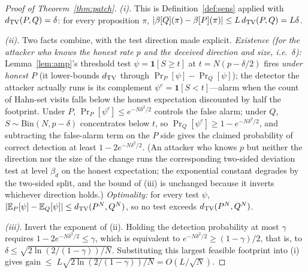 \begin{proof}[Proof of Theorem~\ref{thm:patch}]
\emph{(i).} This is Definition~\ref{def:sens} applied with
$d_{\mathrm{TV}}(P,Q)=\delta$: for every proposition $\pi$,
$|\beta[Q](\pi)-\beta[P](\pi)|\le L\,d_{\mathrm{TV}}(P,Q)=L\delta$.

\emph{(ii).} Two facts combine, with the test direction made explicit.
\emph{Existence (for the attacker who knows the honest rate $p$ and the
deceived direction and size, i.e.\ $\delta$):} Lemma~\ref{lem:amp}'s
threshold test $\psi=\mathbf{1}[S\ge t]$ at $t=N(p-\delta/2)$ fires
\emph{under honest $P$} (it lower-bounds $d_{\mathrm{TV}}$ through
$\Pr_P[\psi]-\Pr_Q[\psi]$); the detector the attacker actually runs is its
complement $\psi^{c}=\mathbf{1}[S<t]$---alarm when the count of Hahn-set
visits falls below the honest expectation discounted by half the
footprint. Under $P$, $\Pr_P[\psi^{c}]\le e^{-N\delta^{2}/2}$ controls the
false alarm; under $Q$, $S\sim\mathrm{Bin}(N,p-\delta)$ concentrates below
$t$, so $\Pr_Q[\psi^{c}]\ge1-e^{-N\delta^{2}/2}$, and subtracting the
false-alarm term on the $P$ side gives the claimed probability of correct
detection at least $1-2e^{-N\delta^{2}/2}$. (An attacker who
knows $p$ but neither the direction nor the size of the change runs the
corresponding two-sided deviation test at level $\beta_d$ on the honest
expectation; the exponential constant degrades by the two-sided split, and
the bound of (iii) is unchanged because it inverts whichever direction
holds.) \emph{Optimality:} for every
test $\psi$, $|\mathbb{E}_P[\psi]-\mathbb{E}_Q[\psi]|\le d_{\mathrm{TV}}(P^{N},Q^{N})$, so no test exceeds
$d_{\mathrm{TV}}(P^{N},Q^{N})$.

\emph{(iii).} Invert the exponent of (ii). Holding the detection
probability at most $\gamma$ requires
$1-2e^{-N\delta^{2}/2}\le\gamma$, which is equivalent to
$e^{-N\delta^{2}/2}\ge(1-\gamma)/2$, that is, to
$\delta\le\sqrt{2\ln(2/(1-\gamma))/N}$. Substituting this largest feasible
footprint into (i) gives
$\text{gain}\;\le\;L\sqrt{2\ln(2/(1-\gamma))/N}=O(L/\sqrt{N})$.
\end{proof}


